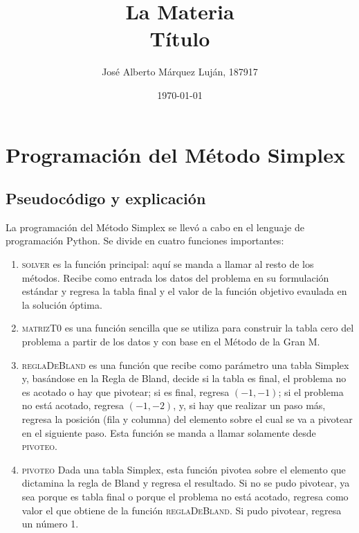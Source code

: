 \documentclass[12pt]{article}
\title{
    La Materia \\
    \large Título
}
\author{José Alberto Márquez Luján, 187917}
\date{\today}
\begin{document}


\section{Programación del Método Simplex}
\subsection{Pseudocódigo y explicación}
La programación del Método Simplex se llevó a cabo en el lenguaje de programación Python. Se divide en cuatro funciones importantes: 
\begin{enumerate}
    \item \textsc{solver} es la función principal: aquí se manda a llamar al resto de los métodos. Recibe como entrada los datos del problema en su formulación estándar y regresa la tabla final y el valor de la función objetivo evaulada en la solución óptima.
    \item \textsc{matrizT0} es una función sencilla que se utiliza para construir la tabla cero del problema a partir de los datos y con base en el Método de la Gran M.
    \item \textsc{reglaDeBland} es una función que recibe como parámetro una tabla Simplex y, basándose en la Regla de Bland, decide si la tabla es final, el problema no es acotado o hay que pivotear; si es final, regresa $(-1, -1)$; si el problema no está acotado, regresa $(-1,-2)$, y, si hay que realizar un paso más, regresa la posición (fila y columna) del elemento sobre el cual se va a pivotear en el siguiente paso. Esta función se manda a llamar solamente desde \textsc{pivoteo}.
    \item \textsc{pivoteo} Dada una tabla Simplex, esta función pivotea sobre el elemento 
    que dictamina la regla de Bland y regresa el resultado. Si no se pudo pivotear, ya sea porque es tabla final o porque el problema no está acotado, regresa como valor el que obtiene de la función \textsc{reglaDeBland}. Si pudo pivotear, regresa un número 1.
\end{enumerate}
\end{document}
